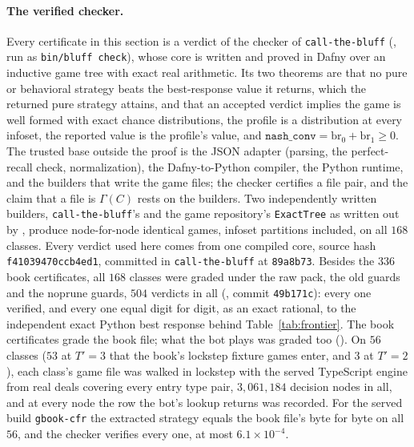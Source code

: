 \documentclass[11pt]{article}
\theoremstyle{plain}
\theoremstyle{definition}
\theoremstyle{remark}
\newcommand{\code}[1]{\texttt{\small #1}}
\begin{document}
\paragraph{The verified checker.} Every certificate in this section is
a verdict of the checker of \code{call-the-bluff}
(, run as \code{bin/bluff check}), whose core is
written and proved in Dafny over an inductive game tree with exact real
arithmetic. Its two theorems are that no pure or behavioral strategy
beats the best-response value it returns, which the returned pure
strategy attains, and that an accepted verdict implies the game is well
formed with exact chance distributions, the profile is a distribution
at every infoset, the reported value is the profile's value, and
$\texttt{nash\_conv}=\mathrm{br}_0+\mathrm{br}_1\ge0$. The trusted base
outside the proof is the JSON adapter (parsing, the perfect-recall
check, normalization), the Dafny-to-Python compiler, the Python
runtime, and the builders that write the game files; the checker
certifies a file pair, and the claim that a file is $\Gamma(C)$ rests
on the builders. Two independently written builders, \code{call-the-bluff}'s
 and the game repository's
\code{ExactTree} as written out by , produce
node-for-node identical games, infoset partitions included, on all $168$
classes. Every verdict used here comes from one compiled core, source
hash \code{f41039470ccb4ed1}, committed in \code{call-the-bluff} at
\code{89a8b73}. Besides the $336$ book certificates, all $168$ classes
were graded under the raw pack, the old guards and the noprune guards,
$504$ verdicts in all (,
commit \code{49b171c}): every one verified, and every one equal digit
for digit, as an exact rational, to the independent exact Python best
response behind Table~\ref{tab:frontier}. The book certificates grade
the book file; what the bot plays was graded too
(). On $56$ classes
($53$ at $T'=3$ that the book's lockstep fixture games enter, and $3$
at $T'=2$), each class's game file was
walked in lockstep with the served TypeScript engine from real deals
covering every entry type pair, $3{,}061{,}184$ decision nodes in all,
and at every node the row the bot's lookup returns was recorded. For the
served build \code{gbook-cfr} the extracted strategy equals the book
file's byte for byte on all $56$, and the checker verifies every one, at
most $6.1\times10^{-4}$.
\end{document}
